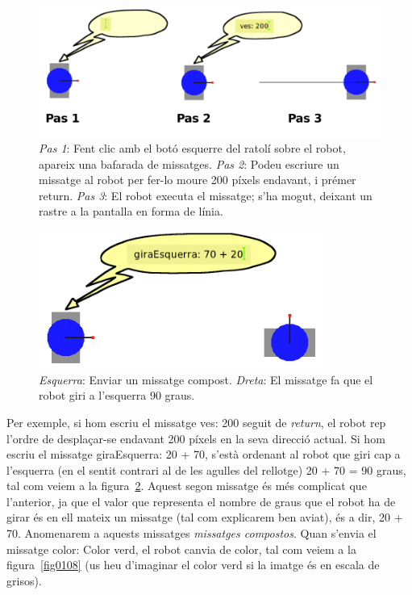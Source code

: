 \newpage

\begin{figure}[h!]
\begin{center}
\includegraphics[scale=0.75]{Imatges/figura1-6}
\end{center}
\caption{\emph{Pas 1}: Fent clic amb el botó esquerre del ratolí sobre el robot, apareix una bafarada de missatges. \emph{Pas 2}: Podeu escriure un missatge al robot per fer-lo moure 200 píxels endavant, i  prémer return. \emph{Pas 3}: El robot executa el missatge; s'ha mogut, deixant un rastre a la pantalla en forma de línia.}
\label{fig0106}
\end{figure}

\vspace*{10mm}

\begin{figure}[h!]
\begin{center}
\includegraphics[height=45mm ,width=93mm ]{Imatges/figura1-7.png}
\end{center}
\caption{\emph{Esquerra}: Enviar un missatge compost. \emph{Dreta}: El missatge fa que el robot giri a l'esquerra 90 graus.}
\label{fig0107}
\end{figure}

\newpage

Per exemple, si hom escriu el missatge \textsf{ves: 200} seguit de \emph{return}, el robot rep l'ordre de desplaçar-se endavant 200 píxels en la seva direcció actual. Si hom escriu el missatge \textsf{giraEsquerra: 20 + 70}, s'està ordenant al robot que giri cap a l'esquerra (en el sentit contrari al de les agulles del rellotge) \textsf{20 + 70 = 90} graus, tal com veiem a la figura~\ref{fig0107}. Aquest segon missatge és més complicat que l'anterior, ja que el valor que representa el nombre de graus que el robot ha de girar és en ell mateix un missatge (tal com explicarem ben aviat), és a dir,  \textsf{20 + 70}. Anomenarem a aquests missatges \emph{missatges compostos}. Quan s'envia el missatge \textsf{color: Color verd}, el robot canvia de color, tal com veiem a la figura~\ref{fig0108} (us heu d'imaginar el color verd si la imatge és en escala de grisos).    

